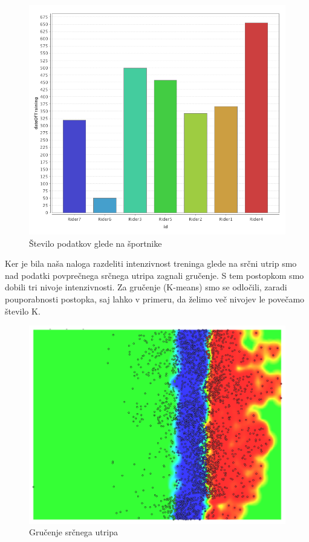 \documentclass[a4paper,11pt]{article}
\begin{document}
\begin{figure}[H]
\caption{Število podatkov glede na športnike}
\centering
\includegraphics[width=1\textwidth]{ridersTrainingsCount}
\end{figure}

Ker je bila naša naloga razdeliti intenzivnost treninga glede na srčni utrip smo nad podatki povprečnega srčnega utripa zagnali gručenje. S tem postopkom smo dobili tri nivoje intenzivnosti. Za gručenje (K-means) smo se odločili, zaradi pouporabnosti postopka, saj lahko v primeru, da želimo več nivojev le povečamo število K.\\

\begin{figure}[H]
\caption{Gručenje srčnega utripa}
\centering
\includegraphics[width=1\textwidth]{HrCLusters}
\end{figure}
 
\end{document}
